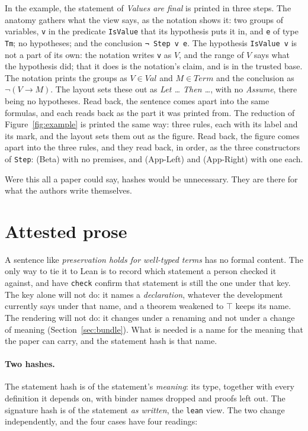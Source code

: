 \documentclass[acmsmall,screen,review,anonymous,nonacm]{acmart}
\begin{document}
In the example, the statement of \emph{Values are final} is printed in
three steps. The anatomy gathers what the view says, as the notation shows
it: two groups of variables, \texttt{v} in the predicate \texttt{IsValue}
that its hypothesis puts it in, and \texttt{e} of type \texttt{Tm}; no
hypotheses; and the conclusion \texttt{¬ Step v e}. The hypothesis
\texttt{IsValue v} is not a part of its own: the notation writes
\texttt{v} as $V$, and the range of $V$ says what the hypothesis did;
that it does is the notation's claim, and is in the trusted base. The
notation prints the groups as $V \in \mathit{Val}$ and
$M \in \mathit{Term}$ and the conclusion as $\neg (V \longrightarrow M)$.
The layout sets these out as \emph{Let \ldots{} Then \ldots}, with no
\emph{Assume}, there being no hypotheses. Read back, the sentence comes
apart into the same formulas, and each
reads back as the part it was printed from. The reduction of
Figure~\ref{fig:example} is printed the same way: three rules, each with
its label and its mark, and the layout sets them out as the figure. Read
back, the figure comes apart into the three rules, and they read back, in
order, as the three constructors of \texttt{Step}: (Beta) with no
premises, and (App-Left) and (App-Right) with one each.

Were this all a paper could say, hashes would be unnecessary. They are
there for what the authors write themselves.

\section{Attested prose}\label{sec:attested}

A sentence like \emph{preservation holds for well-typed terms} has no
formal content. The only way to tie it to Lean is to record which statement
a person checked it against, and have \verb|check| confirm that statement is
still the one under that key. The key alone will not do: it names a
\emph{declaration}, whatever the development currently says under that
name, and a theorem weakened to $\top$ keeps its name. The rendering will
not do: it changes under a renaming and not under a change of meaning
(Section~\ref{sec:bundle}). What is needed is a name for the meaning that
the paper can carry, and the statement hash is that name.

\paragraph{Two hashes.} The statement hash is of the statement's
\emph{meaning}: its type, together with every definition it depends on,
with binder names dropped and proofs left out. The signature hash is of the
statement \emph{as written}, the \texttt{lean} view. The two change
independently, and the four cases have four readings:
\end{document}

